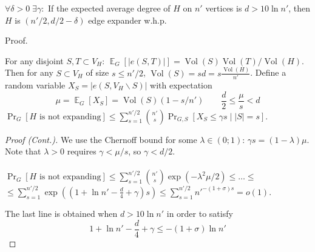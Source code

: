 \documentclass{beamer}
\newcommand{\E}{\mathop{{}\mathbb{E}}}
\DeclareMathOperator*{\Vol}{Vol}
\newcommand{\autotitle}{\secname\ifdefempty{\subsecname}{}{~--- \subsecname}}
\newcommand{\smalldisplayskips}{
    \setlength{\abovedisplayskip}{3pt}
    \setlength{\belowdisplayskip}{3pt}}
\begin{document}
\begin{frame}{\autotitle}
    \begin{lemma}
        $\forall\delta>0\;\exists\gamma:$
        If the expected average degree of $H$ on $n'$ vertices is $d>10\ln n'$,
        then $H$ is $(n'/2,d/2-\delta)$ edge expander w.h.p.
    \end{lemma}
    \begin{block}{Proof.}
        \smalldisplayskips
        For any disjoint $S,T\subset V_H$:
        $\E_G[|e(S,T)|]=\Vol(S)\Vol(T)/\Vol(H)$.
        Then for any $S\subset V_H$ of size $s\leq n'/2$,
        $\Vol(S)=sd=s\frac{\Vol(H)}{n'}$.
        Define a random variable $X_S=|e(S,V_H\backslash S)|$ with expectation
        \begin{equation*}
            \mu=\E_G[X_S]=\Vol(S)(1-s/n')
            \qquad\frac{d}{2}\leq\frac{\mu}{s}<d
        \end{equation*}
        $\Pr_G[H\text{ is not expanding}]
        \leq\sum_{s=1}^{n'/2}{\binom{n'}{s}\Pr_{G,S}[X_S\leq\gamma s\;|\;|S|=s]}$.
    \end{block}
\end{frame}

\begin{frame}{\autotitle}
    \begin{proof}[Proof (Cont.)]
        \smalldisplayskips
        We use the Chernoff bound for some $\lambda\in(0;1)$: $\gamma s=(1-\lambda)\mu$.
        Note that $\lambda>0$ requires $\gamma<\mu/s$, so $\gamma<d/2$.\\~\\
        
        $\Pr_G[H\text{ is not expanding}]
        \leq\sum_{s=1}^{n'/2}{\binom{n'}{s}\exp(-\lambda^2\mu/2)}\leq\ldots\leq$
        $\leq\sum_{s=1}^{n'/2}{\exp\left(\left(
            1+\ln n'
            -\frac{d}{4}
            +\gamma
            \right)s\right)}
        \leq\sum_{s=1}^{n'/2}{n'^{-(1+\sigma)s}}=o(1)$.

        The last line is obtained when $d>10\ln n'$ in order to satisfy
        \begin{equation*}
            1+\ln n'-\frac{d}{4}+\gamma\leq-(1+\sigma)\ln n'
        \end{equation*}
    \end{proof}
\end{frame}
\end{document}
